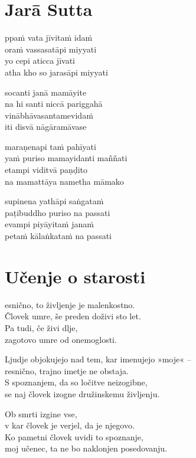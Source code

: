 

\cleartoverso
\chapter{Jarā Sutta}

ppaṁ vata jīvitaṁ idaṁ\\
oraṁ vassasatāpi miyyati\\
yo cepi aticca jīvati\\
atha kho so jarasāpi miyyati

socanti janā mamāyite\\
na hi santi niccā pariggahā\\
vinābhāvasantamevidaṁ\\
iti disvā nāgāramāvase

maraṇenapi taṁ pahīyati\\
yaṁ puriso mamayidanti maññati\\
etampi viditvā paṇḍito\\
na mamattāya nametha māmako

supinena yathāpi saṅgataṁ\\
paṭibuddho puriso na passati\\
evampi piyāyitaṁ janaṁ\\
petaṁ kālaṅkataṁ na passati


\cleartorecto
\chapter*{Učenje o starosti}

esnično, to življenje je malenkostno.\\
Človek umre, še preden doživi sto let.\\
Pa tudi, če živi dlje,\\
zagotovo umre od onemoglosti.

Ljudje objokujejo nad tem, kar imenujejo »moje« --\\
resnično, trajno imetje ne obstaja.\\
S spoznanjem, da so ločitve neizogibne,\\
se naj človek izogne družinskemu življenju.

Ob smrti izgine vse,\\
v kar človek je verjel, da je njegovo.\\
Ko pametni človek uvidi to spoznanje,\\
moj učenec, ta ne bo naklonjen posedovanju.


